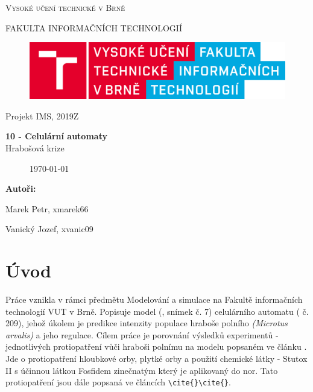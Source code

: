 \documentclass[a4paper,11pt]{article}
\begin{document}

\begin{titlepage}
\begin{center}
    {\Huge \textsc{Vysoké učení technické v Brně}}
    
    {\LARGE \uppercase{FAKULTA INFORMAČNÍCH TECHNOLOGIÍ}}
    
\begin{figure}[h]
\vspace{5.0cm}
\centering
\includegraphics[scale=0.15]{logo.png}
\vspace{-10.0cm}
\end{figure}
    
	{\LARGE Projekt IMS, 2019Z}

	{\Huge \textbf{10 - Celulární automaty}}
\\

{\LARGE {Hrabošová krize}}\\

\begin{figure}[h]
\centering
{\Large {\mydate\today}}
\vspace{6cm}
\end{figure}

\end{center}
\begin{compactitem}
\item[] \textbf{Autoři:}
\item[] Marek Petr, xmarek66
\item[] Vanický Jozef, xvanic09
\end{compactitem}

\end{titlepage}

\tableofcontents
\newpage

\section{Úvod}
Práce vznikla v rámci předmětu Modelování a simulace na Fakultě informačních technologií VUT v Brně. Popisuje model (\cite{slajdy}, snímek č. 7) celulárního automatu (\cite{slajdy} č. 209), jehož úkolem je predikce intenzity populace hraboše polního \textit{(Microtus arvalis)} a jeho regulace. Cílem práce je porovnání výsledků experimentů - jednotlivých protiopatření vůči hraboši polnímu na modelu popsaném ve článku \cite{OurCA}. Jde o protiopatření hloubkové orby, plytké orby a použití chemické látky - Stutox II\cite{stutox-buy} s účinnou látkou Fosfidem zinečnatým který je aplikovaný do nor\cite{stutox-info}. Tato protiopatření jsou dále popsaná ve článcích \verb|\cite{}|\verb|\cite{}|. 
\end{document}
